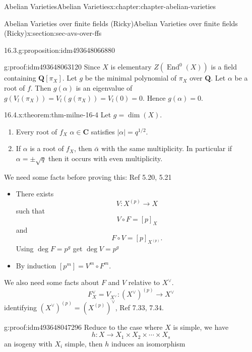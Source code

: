 \documentclass[oneside,10pt,]{book}
\numberwithin{equation}{section}
\newcommand{\lb}{[}
\newcommand{\rb}{]}
\newcommand{\QQ}{\mathbf{Q}}
\newcommand{\CC}{\mathbf{C}}
\DeclareMathOperator{\End}{End}
\begin{document}
\begin{chapterptx}{Abelian Varieties}{}{Abelian Varieties}{}{}{x:chapter:chapter-abelian-varieties}
\begin{sectionptx}{Abelian Varieties over finite fields (Ricky)}{}{Abelian Varieties over finite fields (Ricky)}{}{}{x:section:sec-avs-over-ffs}
\begin{proposition}{16.3.}{}{g:proposition:idm493648066880}
\end{proposition}
\begin{proofptx}{}{g:proof:idm493648063120}
Since \(X\) is elementary \(Z(\End^0(X))\) is  a field containing \(\QQ\lb \pi_X\rb\). Let \(g\) be the minimal polynomial of \(\pi_X\) over \(\QQ\). Let \(\alpha\) be a root of \(f\). Then \(g(\alpha)\) is an eigenvalue of \(g(V_l(\pi_X)) = V_l(g(\pi_X)) = V_l(0) = 0\). Hence \(g(\alpha) = 0\).%
\end{proofptx}
\begin{theorem}{16.4.}{}{x:theorem:thm-milne-16-4}%
Let \(g= \dim (X)\).%
\begin{enumerate}
\item{}Every root of \(f_X\) \(\alpha \in \CC\) satisfies \(|\alpha| = q^{1/2}\).%
\item{}If \(\alpha\) is  a root of \(f_X\), then \(\bar \alpha\) with the same multiplicity. In particular if \(\alpha = \pm \sqrt q\) then it occurs with even multiplicity.%
\end{enumerate}
%
\end{theorem}
We need some facts before proving this: Ref 5.20, 5.21%
\begin{itemize}[label=\textbullet]
\item{}There exists%
\begin{equation*}
V\colon X^{(p)} \to X
\end{equation*}
such that%
\begin{equation*}
V\circ F = [p]_X
\end{equation*}
and%
\begin{equation*}
F \circ V = [p]_{X^{(p)}}\text{.}
\end{equation*}
Using \(\deg F = p^g \)  get \(\deg V = p^g\)%
\item{}By induction \(\lb p^m\rb = V^m \circ F^m\).%
\end{itemize}
%
\par
We also need some facts about \(F\) and \(V\) relative to \(X^\vee\).%
\begin{equation*}
F_X^\vee = V_{X^\vee} \colon (X^\vee)^{(p)} \to X^\vee
\end{equation*}
identifying \((X^\vee)^{(p)} = (X^{(p)})^\vee\), Ref 7.33, 7.34.%
\begin{proofptx}{}{g:proof:idm493648047296}
Reduce to the case where \(X\) is simple, we have%
\begin{equation*}
h\colon X\to X_1 \times X_2 \times \cdots \times X_s
\end{equation*}
an isogeny with \(X_i\) simple, then \(h\) induces an isomorphism%

\end{proofptx}
\end{sectionptx}
\end{chapterptx}
\end{document}
